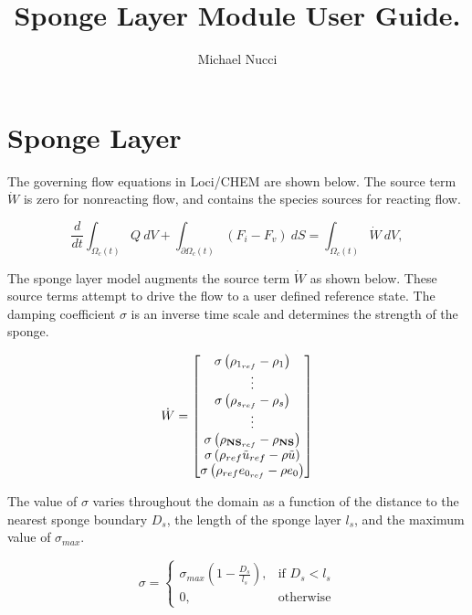 \documentclass{article}
\begin{document}
\title{Sponge Layer Module User Guide.}

\author{ Michael Nucci }

\maketitle
\section{Sponge Layer}

The governing flow equations in Loci/CHEM are shown below. The source term $\Dot{W}$ is zero for nonreacting flow, and contains the species sources for reacting flow.

\begin{equation}
\frac{d}{dt} \int_{\Omega_c(t)} Q ~dV +
\int_{{\partial\Omega_c}(t)} (F_i-F_v) ~dS =
\int_{\Omega_c(t)} \Dot{W} ~dV,
\label{gov_integral}
\end{equation}

The sponge layer model \cite{Mani} augments the source term $\Dot{W}$ as shown below. These source terms attempt to drive the flow to a user defined reference state. The damping coefficient $\sigma$ is an inverse time scale and determines the strength of the sponge.

\begin{equation}
\dot{W} =
\begin{bmatrix}
\sigma \left( \rho_{1_{ref}} - \rho_1 \right) \\
\vdots \\
\sigma \left( \rho_{s_{ref}} - \rho_s \right)\\
\vdots \\
\sigma \left( \rho_{{\mathbf{NS}}_{ref}} - \rho_{\mathbf{NS}} \right) \\
\sigma \left(\rho_{ref} \Tilde{u}_{ref} - \rho \Tilde{u} \right) \\
\sigma \left(\rho_{ref} e_{0_{ref}} - \rho e_0 \right)
\end{bmatrix}
\end{equation}

The value of $\sigma$ varies throughout the domain as a function of the distance to the nearest sponge boundary $D_s$, the length of the sponge layer $l_s$, and the maximum value of $\sigma_{max}$.

\begin{equation}
\sigma =
\begin{cases}
  \sigma_{max} \left( 1 - \frac{D_s}{l_s}\right),& \text{if } D_s < l_s \\
  0,& \text{otherwise}
\end{cases}
\end{equation}
\end{document}
